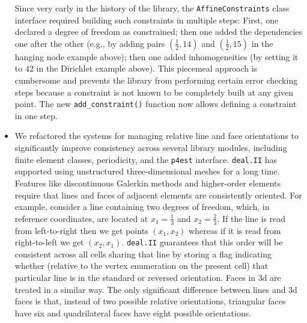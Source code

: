 \documentclass{ansarticle-preprint}
\newcommand{\specialword}[1]{\texttt{#1}}
\newcommand{\dealii}{{\specialword{deal.II}}\xspace}
\newcommand{\pfrst}{{\specialword{p4est}}\xspace}
\begin{document}
\begin{itemize}
    Since very early in the history of the library, the
    \texttt{AffineConstraints} class interface required building such
    constraints in multiple steps: First, one declared a degree of
    freedom as constrained; then one added the dependencies one after
    the other (e.g., by adding pairs $(\frac 12, 14)$ and $(\frac 12,
    15)$ in the hanging node example above); then one added
    inhomogeneities (by setting it to $42$ in the Dirichlet example
    above). This piecemeal approach is cumbersome and prevents the
    library from performing certain error checking steps because a
    constraint is not known to be completely built at any given point. The new
    \texttt{add\_constraint()} function now allows defining a
    constraint in one step.
  \item We refactored the systems for managing relative line and face
    orientations to significantly improve consistency across several library
    modules, including finite element classes, periodicity, and the
    \pfrst{} interface. \dealii{} has supported using unstructured
    three-dimensional meshes for a long time. Features like discontinuous
    Galerkin methods and higher-order elements require that lines and faces of
    adjacent elements are consistently oriented. For example, consider a line
    containing two degrees of freedom, which, in reference coordinates, are
    located at $x_1 = \frac 1 3$ and $x_2 = \frac 2 3$. If the line is read from
    left-to-right then we get points $(x_1, x_2)$ whereas if it is read from
    right-to-left we get $(x_2, x_1)$. \dealii{} guarantees that this order will
    be consistent across all cells sharing that line by storing a flag
    indicating whether (relative to the vertex enumeration on the present cell)
    that particular line is in the standard or reversed orientation. Faces in 3d
    are treated in a similar way. The only significant difference between lines
    and 3d faces is that, instead of two possible relative orientations,
    triangular faces have six and quadrilateral faces have eight
    possible orientations.


\end{itemize}
\end{document}
